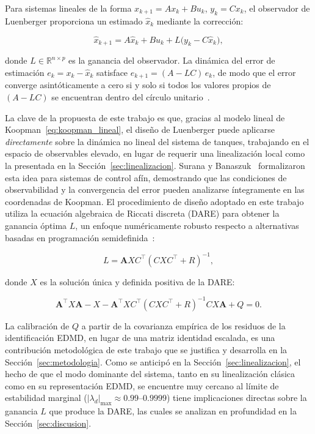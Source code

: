 \documentclass[12pt,letterpaper]{article}
\begin{document}
Para sistemas lineales de la forma $x_{k+1} = Ax_k + Bu_k$, $y_k = Cx_k$, el
observador de Luenberger proporciona un estimado $\hat{x}_k$ mediante la corrección:

\begin{equation}
\hat{x}_{k+1} = A\hat{x}_k + Bu_k + L\bigl(y_k - C\hat{x}_k\bigr),
\label{eq:luenberger}
\end{equation}

donde $L \in \mathbb{R}^{n\times p}$ es la ganancia del observador. La dinámica del
error de estimación $e_k = x_k - \hat{x}_k$ satisface $e_{k+1} = (A - LC)\,e_k$, de
modo que el error converge asintóticamente a cero si y solo si todos los valores
propios de $(A - LC)$ se encuentran dentro del círculo unitario~\cite{rawlings2009}.

La clave de la propuesta de este trabajo es que, gracias al modelo lineal de
Koopman~\eqref{eq:koopman_lineal}, el diseño de Luenberger puede aplicarse
\emph{directamente} sobre la dinámica no lineal del sistema de tanques, trabajando en
el espacio de observables elevado, en lugar de requerir una linealización local como
la presentada en la Sección~\ref{sec:linealizacion}. Surana y
Banaszuk~\cite{surana2016} formalizaron esta idea para sistemas de control afín,
demostrando que las condiciones de observabilidad y la convergencia del error pueden
analizarse íntegramente en las coordenadas de Koopman. El procedimiento de diseño
adoptado en este trabajo utiliza la ecuación algebraica de Riccati discreta (DARE)
para obtener la ganancia óptima $L$, un enfoque numéricamente robusto respecto a
alternativas basadas en programación semidefinida~\cite{ye2025}:

\begin{equation}
L = \mathbf{A} X C^\top (C X C^\top + R)^{-1},
\label{eq:dare_gain_marco}
\end{equation}

donde $X$ es la solución única y definida positiva de la DARE:

\begin{equation}
\mathbf{A}^\top X \mathbf{A} - X - \mathbf{A}^\top X C^\top (C X C^\top + R)^{-1} C X \mathbf{A} + Q = 0.
\end{equation}

La calibración de $Q$ a partir de la covarianza empírica de los residuos de la
identificación EDMD, en lugar de una matriz identidad escalada, es una contribución
metodológica de este trabajo que se justifica y desarrolla en la
Sección~\ref{sec:metodologia}. Como se anticipó en la
Sección~\ref{sec:linealizacion}, el hecho de que el modo dominante del sistema, tanto
en su linealización clásica como en su representación EDMD, se encuentre muy cercano
al límite de estabilidad marginal ($|\lambda_d|_{\max}\approx0.99$--$0.9999$) tiene
implicaciones directas sobre la ganancia $L$ que produce la DARE, las cuales se
analizan en profundidad en la Sección~\ref{sec:discusion}.
\end{document}
